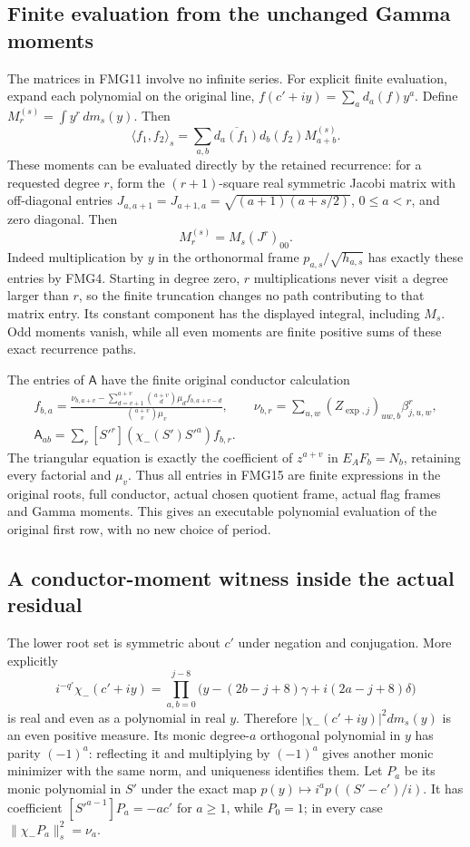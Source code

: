 \documentclass[11pt,a4paper]{article}
\begin{document}
\subsection{Finite evaluation from the unchanged Gamma moments}
The matrices in FMG11 involve no infinite series. For explicit finite
evaluation, expand each polynomial on the original line,
$f(c'+iy)=\sum_a d_a(f)y^a$. Define
$M_r^{(s)}=\int y^r\,dm_s(y)$. Then
\[
 \langle f_1,f_2\rangle_s
    =\sum_{a,b}\overline{d_a(f_1)}d_b(f_2)M_{a+b}^{(s)}.
                                                               \tag{FMG18}
\]
These moments can be evaluated directly by the retained recurrence:
for a requested degree $r$, form the $(r+1)$-square real symmetric
Jacobi matrix with off-diagonal entries
$J_{a,a+1}=J_{a+1,a}=\sqrt{(a+1)(a+s/2)}$, $0\le a<r$,
and zero diagonal. Then
\[
        M_r^{(s)}=M_s(J^r)_{00}.                         \tag{FMG19}
\]
Indeed multiplication by $y$ in the orthonormal frame
$p_{a,s}/\sqrt{h_{a,s}}$ has exactly these entries by FMG4.
Starting in degree zero, $r$ multiplications never visit a degree
larger than $r$, so the finite truncation changes no path contributing
to that matrix entry. Its constant component has the displayed
integral, including $M_s$. Odd moments vanish, while all even
moments are finite positive sums of these exact recurrence paths.

The entries of $\mathsf A$ have the finite original conductor
calculation
\[
\begin{gathered}
 f_{b,a}=\frac{\nu_{b,a+v}-\sum_{d=v+1}^{a+v}
          \binom{a+v}{d}\mu_df_{b,a+v-d}}
          {\binom{a+v}{v}\mu_v},\qquad
 \nu_{b,r}=\sum_{u,w}(Z_{\exp,j})_{uw,b}\beta_{j,u,w}^{r},\\
 \mathsf A_{ab}=
       \sum_r[S'^r](\chi_-(S')S'^a)f_{b,r}.
\end{gathered}                                                   \tag{FMG20}
\]
The triangular equation is exactly the coefficient of $z^{a+v}$
in $E_AF_b=N_b$, retaining every factorial and $\mu_v$.
Thus all entries in FMG15 are finite expressions in the original
roots, full conductor, actual chosen quotient frame, actual flag
frames and Gamma moments. This gives an executable polynomial
evaluation of the original first row, with no new choice of period.

\subsection{A conductor-moment witness inside the actual residual}
The lower root set is symmetric about $c'$ under negation and
conjugation. More explicitly
\[
 i^{-q'}\chi_-(c'+iy)=
 \prod_{a,b=0}^{j-8}\bigl(y-(2b-j+8)\gamma+i(2a-j+8)\delta\bigr)
                                                               \tag{FMG21}
\]
is real and even as a polynomial in real $y$. Therefore
$|\chi_-(c'+iy)|^2dm_s(y)$ is an even positive measure.
Its monic degree-$a$ orthogonal polynomial in $y$ has parity
$(-1)^a$: reflecting it and multiplying by $(-1)^a$ gives another
monic minimizer with the same norm, and uniqueness identifies them.
Let $P_a$ be its monic polynomial in $S'$ under the exact map
$p(y)\mapsto i^ap((S'-c')/i)$. It has coefficient
$[S'^{a-1}]P_a=-ac'$ for $a\ge1$, while $P_0=1$; in every
case $\|\chi_-P_a\|_s^2=\nu_a$.
\end{document}
